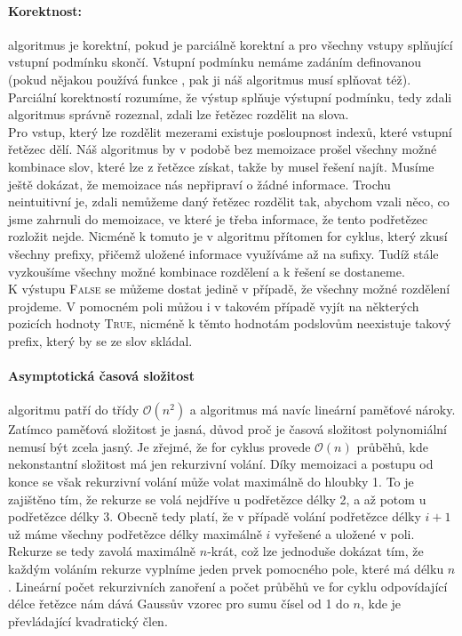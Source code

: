 \documentclass[12pt]{iv003}
\begin{document}
\paragraph{Korektnost:} algoritmus je korektní, pokud je parciálně korektní a pro všechny vstupy splňující vstupní podmínku skončí. Vstupní podmínku nemáme zadáním definovanou (pokud nějakou používá funkce \ffdict, pak ji náš algoritmus musí splňovat též). Parciální korektností rozumíme, že výstup splňuje výstupní podmínku, tedy zdali algoritmus správně rozeznal, zdali lze řetězec rozdělit na slova.\\
Pro vstup, který lze rozdělit mezerami existuje posloupnost indexů, které vstupní řetězec dělí. Náš algoritmus by v podobě bez memoizace prošel všechny možné kombinace slov, které lze z řetězce získat, takže by musel řešení najít. Musíme ještě dokázat, že memoizace nás nepřipraví o žádné informace. Trochu neintuitivní je, zdali nemůžeme daný řetězec rozdělit tak, abychom vzali něco, co jsme zahrnuli do memoizace, ve které je třeba informace, že tento podřetězec rozložit nejde. Nicméně k tomuto je v algoritmu přítomen for cyklus, který zkusí všechny prefixy, přičemž uložené informace využíváme až na sufixy. Tudíž stále vyzkoušíme všechny možné kombinace rozdělení a k řešení se dostaneme.\\
K výstupu \textsc{False} se můžeme dostat jedině v případě, že všechny možné rozdělení projdeme. V pomocném poli můžou i v takovém případě vyjít na některých pozicích hodnoty \textsc{True}, nicméně k těmto hodnotám podslovům neexistuje takový prefix, který by se ze slov skládal.
\paragraph{Asymptotická časová složitost} algoritmu patří do třídy $\mathcal{O}(n^{2})$ a algoritmus má navíc lineární paměťové nároky. Zatímco paměťová složitost je jasná, důvod proč je časová složitost polynomiální nemusí být zcela jasný. Je zřejmé, že for cyklus provede $\mathcal{O}(n)$ průběhů, kde nekonstantní složitost má jen rekurzivní volání. Díky memoizaci a postupu od konce se však rekurzivní volání může volat maximálně do hloubky 1. To je zajištěno tím, že rekurze se volá nejdříve u podřetězce délky 2, a až potom u podřetězce délky 3. Obecně tedy platí, že v případě volání podřetězce délky $i+1$ už máme všechny podřetězce délky maximálně $i$ vyřešené a uložené v poli. Rekurze se tedy zavolá maximálně $n$-krát, což lze jednoduše dokázat tím, že každým voláním rekurze vyplníme jeden prvek pomocného pole, které má délku $n$. Lineární počet rekurzivních zanoření a počet průběhů ve for cyklu odpovídající délce řetězce nám dává Gaussův vzorec pro sumu čísel od 1 do $n$, kde je převládající kvadratický člen.
\end{document}
